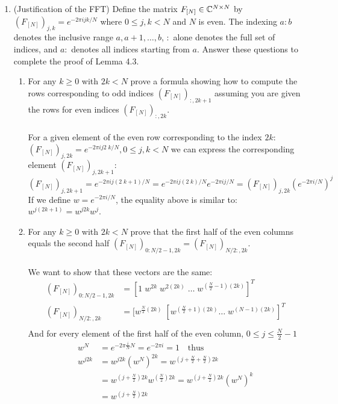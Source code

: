 \documentclass[12pt,twoside]{article}
\begin{document}
\begin{enumerate}
\newpage
\item (Justification of the FFT) Define the matrix
  $F_{[N]}\in\mathbb{C}^{N\times N}$ by
  $(F_{[N]})_{j,k}=e^{-2\pi i jk/N}$ where $0\leq j,k<N$ and $N$ is even.
  The indexing $a:b$ denotes the
  inclusive range $a,a+1,\ldots,b$, $:$ alone denotes the
  full set of indices, and $a:$ denotes all indices starting from $a$. Answer these questions to complete the proof of Lemma 4.3.
  \begin{enumerate}
  \item For any $k\geq 0$ with $2k<N$ prove a formula showing how to
    compute the rows corresponding to odd indices $(F_{[N]})_{:,2k+1}$ assuming you are given the rows for even indices $(F_{[N]})_{:,2k}$.\\ \\
    For a given element of the even row corresponding to the index $2k$: $(F_{[N]})_{j,2k}=e^{-2\pi i j 2\; k/N}, 0\leq j,k<N$ we can express the corresponding
    element $(F_{[N]})_{j,2k+1}$:
    $$
    	(F_{[N]})_{j,2k+1}=e^{-2\pi i j (2\; k + 1)/N} = e^{-2\pi i j (2\; k)/N} e^{-2\pi i j/N}  = (F_{[N]})_{j,2k} (e^{-2\pi i /N})^j
    $$
    If we define $w = e^{-2\pi i /N}$, the equality above is similar to: $w^{j (2k + 1)} = w^{j 2k} w^j$.
    
  \item For any $k\geq 0$ with $2k<N$ prove that the first half of the even columns equals the second half $(F_{[N]})_{0:N/2-1,2k}=(F_{[N]})_{N/2:,2k}$.  \\ \\
  We want to show that these vectors are the same:
  \begin{align*}
  	(F_{[N]})_{0:N/2-1,2k}	&= [1 \; w^{2k} \; w^{2 (2k)} \; \ldots \; w^{(\frac{N}{2} -1) (2k)} ]^T \\
  	(F_{[N]})_{N/2:,2k}		&= [w^{\frac{N}{2} (2k)}  \; [w^{(\frac{N}{2} + 1) (2k)}  \ldots \; w^{(N -1) (2k)} ]^T \\
  \end{align*}
  And for every element of the first half of the even column, $0 \le j \le \frac{N}{2}-1$
  \begin{align*}
  	w^N		&=	 e^{-2\pi \frac{i}{N} N} = e^{-2\pi i} = 1 \text{ ~ thus }\\ 	
  	w^{j 2k} 	&=	w^{j 2k} (w^N)^{2k} = w^{ (j +  \frac{N}{2} +  \frac{N}{2}) 2k} \\
			&= 	w^{ (j +  \frac{N}{2}) 2k} w^{(\frac{N}{2}) 2k} = w^{ (j +  \frac{N}{2}) 2k} (w^N)^k\\
			&= 	 w^{ (j +  \frac{N}{2}) 2k}
  \end{align*}
    

\end{enumerate}
\end{enumerate}
\end{document}

